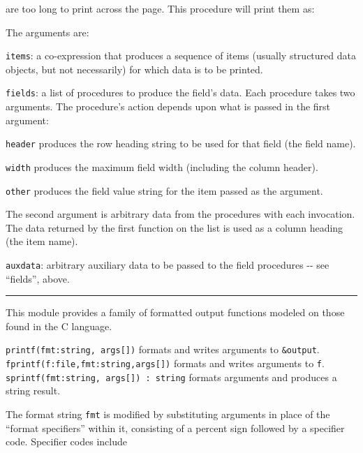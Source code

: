 are too long to print across the page. This procedure will print them
as:


The arguments are:

\texttt{items}: a co-expression that produces a sequence of items
(usually structured data objects, but not necessarily) for which data
is to be printed.

\texttt{fields}: a list of procedures to produce the
field's data. Each procedure takes two arguments. The
procedure's action depends upon what is passed in the
first argument:

\texttt{header} produces the row heading string to be used for that
field (the field name).

\texttt{width} produces the maximum field width (including the column
header).

\texttt{other} produces the field value string for the item passed as
the argument.

The second argument is arbitrary data from the procedures with each
invocation. The data returned by the first function on the list is used
as a column heading (the item name).

\texttt{auxdata}: arbitrary auxiliary data to be passed to the field
procedures -{}- see ``fields'', above.

\vspace{0.25cm}\hrule{}

This module provides a family of formatted output functions
modeled on those found in the C language.

\texttt{printf(fmt:string, args[])} formats and writes arguments to
\texttt{\&output}.\\
\texttt{fprintf(f:file,fmt:string,args[])} formats and writes arguments
to \texttt{f}.\\
\texttt{sprintf(fmt:string, args[]) : string} formats arguments and
produces a string result.

The format string \texttt{fmt} is modified by substituting arguments
in place of the ``format specifiers'' within it, consisting of a
percent sign followed by a specifier code.  Specifier codes include


